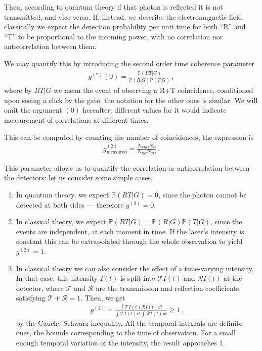 \documentclass[main.tex]{subfiles}
\begin{document}
Then, according to quantum theory if that photon is reflected it is not transmitted, and vice versa. 
If, instead, we describe the electromagnetic field classically we expect the detection probability per unit time for both ``R'' and ``T'' to be proportional to the incoming power, with no correlation nor anticorrelation between them. 

We may quantify this by introducing the second order time coherence parameter 
%
\begin{align}
g^{(2)} (0) = \frac{ \mathbb{P} (RT | G) }{\mathbb{P}(R|G) \mathbb{P}(T|G)}
\,,
\end{align}
%
where by \(RT | G\) we mean the event of observing a R+T coincidence, conditioned upon seeing a click by the gate; the notation for the other ones is similar. We will omit the argument \((0)\) hereafter; different values for it would indicate measurement of correlations at different times. 

This can be computed by counting the number of coincidences, the expression is 
%
\begin{align}
g^{(2)}_{\text{measured}} = \frac{N_{TRG} N_G}{N_{RG} N_{TG}}
\,.
\end{align}

This parameter allows us to quantify the correlation or anticorrelation between the detectors: let us consider some simple cases. 

\begin{enumerate}
    \item In quantum theory, we expect \(\mathbb{P}(RT|G) = 0\), since the photon cannot be detected at both sides --- therefore \(g^{(2)} = 0\).
    \item In classical theory, we expect \(\mathbb{P}(RT|G) = \mathbb{P}(R|G) \mathbb{P}(T|G)\), since the events are independent, at each moment in time. If the laser's intensity is constant this can be extrapolated through the whole observation to yield \(g^{(2)} = 1\). 
    \item In classical theory we can also consider the effect of a time-varying intensity. In that case, this intensity \(I(t)\) is split into \(\mathcal{T}I(t)\) and \(\mathcal{R}I(t)\) at the detector, where \(\mathcal{T}\) and \(\mathcal{R}\) are the transmission and reflection coefficients, satisfying \(\mathcal{T} + \mathcal{R} =1\). Then, we get 
    \begin{align}
    g^{(2)} = \frac{ \int \mathcal{T} I(t) \mathcal{R}I(t) \dd{t}}{ \int \mathcal{T} I(t) \dd{t} \int \mathcal{R} I(t) \dd{t}} \geq 1
    \,,
    \end{align}
    by the Cauchy-Schwarz inequality. All the temporal integrals are definite ones, the bounds corresponding to the time of observation. For a small enough temporal variation of the intensity, the result approaches 1. 
\end{enumerate}
\end{document}
